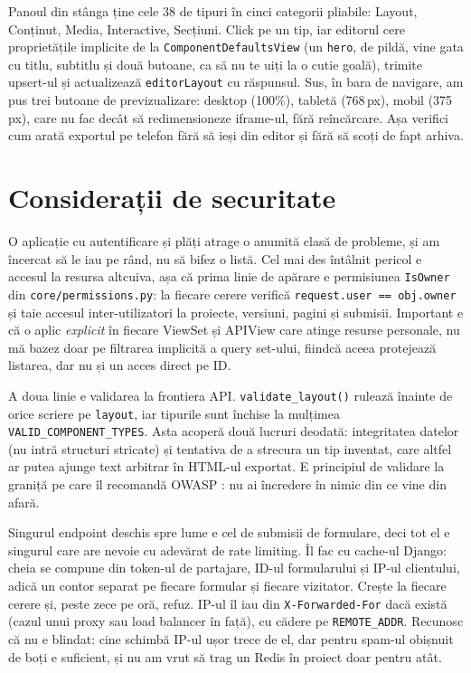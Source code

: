 \documentclass[12pt,a4paper]{report}
\begin{document}
Panoul din stânga ține cele 38 de tipuri în cinci categorii pliabile: Layout,
Conținut, Media, Interactive, Secțiuni. Click pe un tip, iar editorul cere
proprietățile implicite de la \texttt{ComponentDefaultsView} (un \texttt{hero}, de
pildă, vine gata cu titlu, subtitlu și două butoane, ca să nu te uiți la o cutie
goală), trimite upsert-ul și actualizează \texttt{editorLayout} cu răspunsul. Sus, în
bara de navigare, am pus trei butoane de previzualizare: desktop (100\%), tabletă
(768\,px), mobil (375\,px), care nu fac decât să redimensioneze iframe-ul, fără
reîncărcare. Așa verifici cum arată exportul pe telefon fără să ieși din editor și
fără să scoți de fapt arhiva.

\section{Considerații de securitate}

O aplicație cu autentificare și plăți atrage o anumită clasă de probleme, și am
încercat să le iau pe rând, nu să bifez o listă. Cel mai des întâlnit pericol e accesul
la resursa altcuiva, așa că prima linie de apărare e permisiunea \texttt{IsOwner} din
\texttt{core/permissions.py}: la fiecare cerere verifică \texttt{request.user ==
obj.owner} și taie accesul inter-utilizatori la proiecte, versiuni, pagini și submisii.
Important e că o aplic \emph{explicit} în fiecare ViewSet și APIView care atinge
resurse personale, nu mă bazez doar pe filtrarea implicită a query set-ului, fiindcă
aceea protejează listarea, dar nu și un acces direct pe ID.

A doua linie e validarea la frontiera API. \texttt{validate\_layout()} rulează înainte
de orice scriere pe \texttt{layout}, iar tipurile sunt închise la mulțimea
\texttt{VALID\_COMPONENT\_TYPES}. Asta acoperă două lucruri deodată: integritatea
datelor (nu intră structuri stricate) și tentativa de a strecura un tip inventat,
care altfel ar putea ajunge text arbitrar în HTML-ul exportat. E principiul de
validare la graniță pe care îl recomandă OWASP \cite{owasp2021}: nu ai încredere în
nimic din ce vine din afară.

Singurul endpoint deschis spre lume e cel de submisii de formulare, deci tot el e
singurul care are nevoie cu adevărat de rate limiting. Îl fac cu cache-ul Django: cheia se
compune din token-ul de partajare, ID-ul formularului și IP-ul clientului, adică un
contor separat pe fiecare formular și fiecare vizitator. Crește la fiecare cerere și,
peste zece pe oră, refuz. IP-ul îl iau din \texttt{X-Forwarded-For} dacă există (cazul
unui proxy sau load balancer în față), cu cădere pe \texttt{REMOTE\_ADDR}. Recunosc că
nu e blindat: cine schimbă IP-ul ușor trece de el, dar pentru spam-ul obișnuit de
boți e suficient, și nu am vrut să trag un Redis în proiect doar pentru atât.
\end{document}
